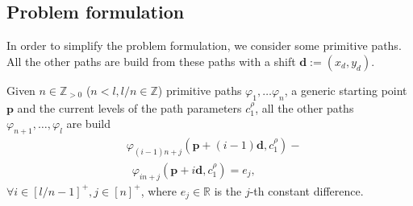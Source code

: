 \documentclass[letterpaper,10pt,conference]{ieeeconf}
\theoremstyle{definition}
\begin{document}




\subsection{Problem formulation}

In order to simplify the problem formulation, we consider some primitive paths. All the other paths are build from these paths with a shift $\mathbf{d}:=(x_d,y_d)$.

Given $n\in\mathbb{Z}_{>0}$ ($n<l,l/n\in\mathbb{Z}$) primitive paths $\varphi_1,\dots\varphi_n$, a generic starting point $\mathbf{p}$ and the current levels of the path parameters $c_1^\rho$, all the other paths $\varphi_{n+1},\dots,\varphi_l$ are build
\begin{equation}\label{eq:primitive}\begin{split}
  &\varphi_{(i-1)n+j}(\mathbf{p}+(i-1)\mathbf{d},c_1^\rho)-\\ &\,\,\,\varphi_{in+j}(\mathbf{p}+i\mathbf{d},c_1^\rho)=e_j,
\end{split}\end{equation}
$\forall i\in[l/n-1]^+,j\in[n]^+$, where $e_j\in\mathbb{R}$ is the $j$-th constant difference.
\end{document}

